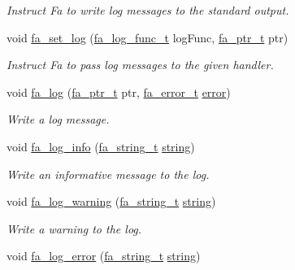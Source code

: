 \begin{DoxyCompactItemize}
\begin{DoxyCompactList}\small\item\em Instruct Fa to write log messages to the standard output. \end{DoxyCompactList}\item 
void \hyperlink{group___fa_utility_ga97a486eb85c974972eebfd7d69eaa8c3}{fa\-\_\-set\-\_\-log} (\hyperlink{group___fa_utility_ga1f914d0c16f566e96a08db3a3446aab7}{fa\-\_\-log\-\_\-func\-\_\-t} log\-Func, \hyperlink{group___fa_ga915ddeae99ad7568b273d2b876425197}{fa\-\_\-ptr\-\_\-t} ptr)
\begin{DoxyCompactList}\small\item\em Instruct Fa to pass log messages to the given handler. \end{DoxyCompactList}\item 
void \hyperlink{group___fa_utility_ga9567a792b3679742c7ab6535c368be60}{fa\-\_\-log} (\hyperlink{group___fa_ga915ddeae99ad7568b273d2b876425197}{fa\-\_\-ptr\-\_\-t} ptr, \hyperlink{group___fa_error_ga4a4feb4d3686657ac8dbd2be421cbb15}{fa\-\_\-error\-\_\-t} \hyperlink{group___fa_error_gga5cf5c13f1e12ae6b125c0265f59f4d82ad606e435413ea0944dd00d49e901e4ed}{error})
\begin{DoxyCompactList}\small\item\em Write a log message. \end{DoxyCompactList}\item 
void \hyperlink{group___fa_utility_ga7d0eec2d02accbcf65148ea41e680b1e}{fa\-\_\-log\-\_\-info} (\hyperlink{group___fa_string_gacada63033b77bc6c39fa632ae199349b}{fa\-\_\-string\-\_\-t} \hyperlink{util_8h_a41106000aac73b61e4fc2ef9dd39a603}{string})
\begin{DoxyCompactList}\small\item\em Write an informative message to the log. \end{DoxyCompactList}\item 
void \hyperlink{group___fa_utility_gaadbae9a73993245706ca501b11b531ec}{fa\-\_\-log\-\_\-warning} (\hyperlink{group___fa_string_gacada63033b77bc6c39fa632ae199349b}{fa\-\_\-string\-\_\-t} \hyperlink{util_8h_a41106000aac73b61e4fc2ef9dd39a603}{string})
\begin{DoxyCompactList}\small\item\em Write a warning to the log. \end{DoxyCompactList}\item 
void \hyperlink{group___fa_utility_gaf6025219b330102e95a473aa2450bd7f}{fa\-\_\-log\-\_\-error} (\hyperlink{group___fa_string_gacada63033b77bc6c39fa632ae199349b}{fa\-\_\-string\-\_\-t} \hyperlink{util_8h_a41106000aac73b61e4fc2ef9dd39a603}{string})

\end{DoxyCompactItemize}
